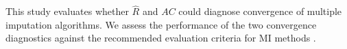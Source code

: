 \documentclass[article]{jss}
\begin{document}
This study evaluates whether $\widehat{R}$ and $AC$ could diagnose convergence of multiple imputation algorithms. %
We assess the performance of the two convergence diagnostics against the recommended evaluation criteria for MI methods \citep[i.e., average bias, average confidence interval width, and empirical coverage rate across simulations;][\S~2.5.2]{buur18}. %

\end{document}
